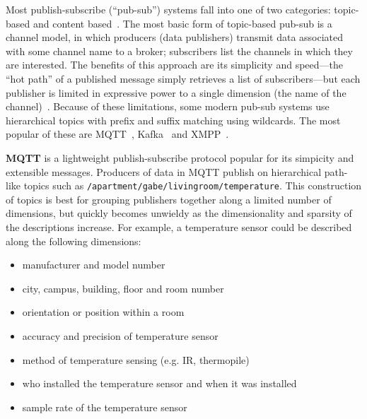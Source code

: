 Most publish-subscribe (``pub-sub'') systems fall into one of two categories: topic-based and content based~\cite{eugster2003many}.
The most basic form of topic-based pub-sub is a channel model, in which producers (data publishers) transmit data associated with some channel name to a broker; subscribers list the channels in which they are interested.
The benefits of this approach are its simplicity and speed---the ``hot path'' of a published message simply retrieves a list of subscribers---but each publisher is limited in expressive power to a single dimension (the name of the channel)~\cite{redis}.
Because of these limitations, some modern pub-sub systems use hierarchical topics with prefix and suffix matching using wildcards. The most popular of these are MQTT~\cite{locke2010mq}, Kafka~\cite{kreps2011kafka} and XMPP~\cite{saint2011extensible}.


\textbf{MQTT} is a lightweight publish-subscribe protocol popular for its simpicity and extensible messages.
Producers of data in MQTT publish on hierarchical path-like topics such as \texttt{/apartment/gabe/livingroom/temperature}.
This construction of topics is best for grouping publishers together along a limited number of dimensions, but quickly becomes unwieldy as the dimensionality and sparsity of the descriptions increase.
For example, a temperature sensor could be described along the following dimensions:

\begin{itemize}
\item manufacturer and model number
\item city, campus, building, floor and  room number
\item orientation or position within a room
\item accuracy and precision of temperature sensor
\item method of temperature sensing (e.g. IR, thermopile)
\item who installed the temperature sensor and when it was installed
\item sample rate of the temperature sensor
\end{itemize}

